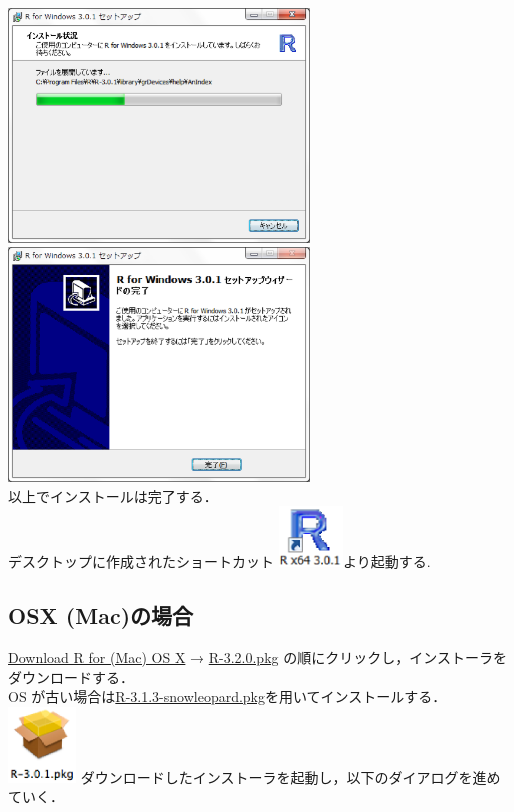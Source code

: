 \includegraphics[width=8cm]{img/windows/win010.eps}\hspace{0.8em} \includegraphics[width=8cm]{img/windows/win011.eps}\\

以上でインストールは完了する．\\

デスクトップに作成されたショートカット \includegraphics[width=1.7cm]{img/windows/win012.eps}より起動する.
\subsection{OSX (Mac)の場合}
\underline{Download R for (Mac) OS X} → \underline{R-3.2.0.pkg} の順にクリックし，インストーラをダウンロードする．\\
OS が古い場合は\underline{R-3.1.3-snowleopard.pkg}を用いてインストールする．
\includegraphics[width=1.8cm]{img/osx/osx001.eps} ダウンロードしたインストーラを起動し，以下のダイアログを進めていく．\\

